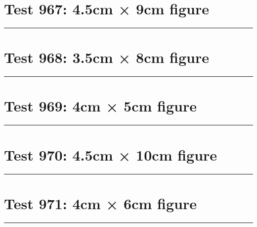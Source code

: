 \documentclass[a4paper,11pt]{article}
\begin{document}
\section*{Test 967: 4.5cm × 9cm figure}
\begin{swarmwrap}%
  \begin{minipage}[t]{4cm}
    \centering
    \rule{\linewidth}{9cm}
  \end{minipage}%
\end{swarmwrap}%
\swarmwrapnext
\lipsum[68]
\lipsum[69]
\lipsum[70]
\lipsum[71]
\lipsum[72]
\section*{Test 968: 3.5cm × 8cm figure}
\begin{swarmwrap}%
  \begin{minipage}[t]{3cm}
    \centering
    \rule{\linewidth}{8cm}
  \end{minipage}%
\end{swarmwrap}%
\swarmwrapnext
\lipsum[11]
\lipsum[12]
\lipsum[13]
\lipsum[14]
\lipsum[15]
\lipsum[16]
\section*{Test 969: 4cm × 5cm figure}
\begin{swarmwrap}%
  \begin{minipage}[t]{4cm}
    \centering
    \rule{\linewidth}{5cm}
  \end{minipage}%
\end{swarmwrap}%
\swarmwrapnext
\lipsum[58]
\lipsum[59]
\lipsum[60]
\lipsum[61]
\lipsum[62]
\section*{Test 970: 4.5cm × 10cm figure}
\begin{swarmwrap}%
  \begin{minipage}[t]{4cm}
    \centering
    \rule{\linewidth}{10cm}
  \end{minipage}%
\end{swarmwrap}%
\swarmwrapnext
\lipsum[93]
\lipsum[94]
\lipsum[95]
\lipsum[96]
\lipsum[97]
\lipsum[98]
\section*{Test 971: 4cm × 6cm figure}
\begin{swarmwrap}%
  \begin{minipage}[t]{4cm}
    \centering
    \rule{\linewidth}{6cm}
  \end{minipage}%
\end{swarmwrap}%
\swarmwrapnext
\lipsum[144]
\lipsum[145]
\lipsum[146]
\lipsum[147]
\end{document}
